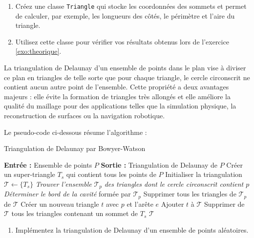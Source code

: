 \documentclass[a4paper,12pt]{article}
\begin{document}
\label{exo:triangle}
\begin{enumerate}
  \item Créez une classe \texttt{Triangle} qui stocke les coordonnées des sommets et permet de calculer, par exemple, les longueurs des côtés, le périmètre et l’aire du triangle. 
  \item Utilisez cette classe pour vérifier vos résultats obtenus lors de l'exercice \ref{exo:theorique}.
\end{enumerate} 




La triangulation de Delaunay d'un ensemble de points dans le plan vise à diviser ce plan en triangles de telle sorte que pour chaque triangle, le cercle circonscrit ne contient aucun autre point de l'ensemble. Cette propriété a deux avantages majeurs : elle évite la formation de triangles très allongés et elle améliore la qualité du maillage pour des applications telles que la simulation physique, la reconstruction de surfaces ou la navigation robotique.

Le pseudo-code ci-dessous résume l'algorithme :

\begin{algorithm}
\caption{Triangulation de Delaunay par Bowyer-Watson}
\begin{algorithmic}[1]
\State \textbf{Entrée :} Ensemble de points \(P\)
\State \textbf{Sortie :} Triangulation de Delaunay de \(P\)
\State Créer un super-triangle \(T_s\) qui contient tous les points de \(P\)
\State Initialiser la triangulation \(\mathcal{T} \gets \{T_s\}\)
    \State \emph{Trouver l'ensemble} \(\mathcal{T}_p\) \emph{des triangles dont le cercle circonscrit contient \(p\)}
    \State \emph{Déterminer le bord de la cavité} formée par \(\mathcal{T}_p\)
    \State Supprimer tous les triangles de \(\mathcal{T}_p\) de \(\mathcal{T}\)
         \State Créer un nouveau triangle \(t\) avec \(p\) et l'arête \(e\)
         \State Ajouter \(t\) à \(\mathcal{T}\)
    \EndFor
\EndFor
\State Supprimer de \(\mathcal{T}\) tous les triangles contenant un sommet de \(T_s\)
\State \Return \(\mathcal{T}\)
\end{algorithmic}
\end{algorithm}

\begin{enumerate}
  \item Implémentez la triangulation de Delaunay d'un ensemble de points aléatoires.
\end{enumerate}
\end{document}
